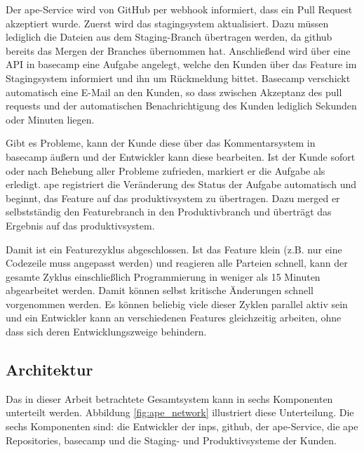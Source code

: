 Der \gls{ape}-Service wird von GitHub per \Gls{webhook} informiert, dass ein Pull Request akzeptiert wurde. Zuerst wird das \gls{stagingsystem} aktualisiert. Dazu müssen lediglich die Dateien aus dem Staging-Branch übertragen werden, da \gls{github} bereits das Mergen der Branches übernommen hat. Anschließend wird über eine API in \gls{basecamp} eine Aufgabe angelegt, welche den Kunden über das Feature im Stagingsystem informiert und ihn um Rückmeldung bittet. Basecamp verschickt automatisch eine E-Mail an den Kunden, so dass zwischen Akzeptanz des \glspl{pull request} und der automatischen Benachrichtigung des Kunden lediglich Sekunden oder Minuten liegen.

Gibt es Probleme, kann der Kunde diese über das Kommentarsystem in \gls{basecamp} äußern und der Entwickler kann diese bearbeiten. Ist der Kunde sofort oder nach Behebung aller Probleme zufrieden, markiert er die Aufgabe als erledigt. \gls{ape} registriert die Veränderung des Status der Aufgabe automatisch und beginnt, das Feature auf das \gls{produktivsystem} zu übertragen. Dazu merged er selbstständig den Featurebranch in den Produktivbranch und überträgt das Ergebnis auf das \gls{produktivsystem}.

Damit ist ein Featurezyklus abgeschlossen. Ist das Feature klein (z.B. nur eine Codezeile muss angepasst werden) und reagieren alle Parteien schnell, kann der gesamte Zyklus einschließlich Programmierung in weniger als 15 Minuten abgearbeitet werden. Damit können selbst kritische Änderungen schnell vorgenommen werden. Es können beliebig viele dieser Zyklen parallel aktiv sein und ein Entwickler kann an verschiedenen Features gleichzeitig arbeiten, ohne dass sich deren Entwicklungszweige behindern.


\subsection{Architektur} %
\label{sub:architektur}

Das in dieser Arbeit betrachtete Gesamtsystem kann in sechs Komponenten unterteilt werden. Abbildung \ref{fig:ape_network} illustriert diese Unterteilung. Die sechs Komponenten sind:  die Entwickler der \gls{inps},  \gls{github},  der \gls{ape}-Service,  die \gls{ape} Repositories,  \gls{basecamp} und  die Staging- und Produktivsysteme der Kunden.

